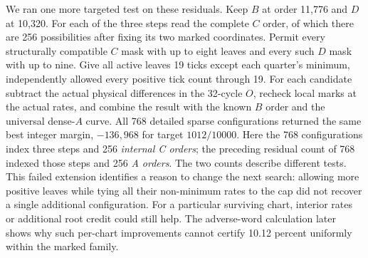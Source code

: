 We ran one more targeted test on these residuals. Keep \(B\) at order 11,776 and \(D\) at 10,320. For each of the three steps read the complete \(C\) order, of which there are 256 possibilities after fixing its two marked coordinates. Permit every structurally compatible \(C\) mask with up to eight leaves and every such \(D\) mask with up to nine. Give all active leaves 19 ticks except each quarter's minimum, independently allowed every positive tick count through 19. For each candidate subtract the actual physical differences in the 32-cycle \(O\), recheck local marks at the actual rates, and combine the result with the known \(B\) order and the universal dense-\(A\) curve. All 768 detailed sparse configurations returned the same best integer margin, \(-136{,}968\) for target \(1012/10000\). Here the 768 configurations index three steps and 256 \emph{internal C orders}; the preceding residual count of 768 indexed those steps and 256 \emph{A orders}. The two counts describe different tests. This failed extension identifies a reason to change the next search: allowing more positive leaves while tying all their non-minimum rates to the cap did not recover a single additional configuration. For a particular surviving chart, interior rates or additional root credit could still help. The adverse-word calculation later shows why such per-chart improvements cannot certify 10.12 percent uniformly within the marked family.
